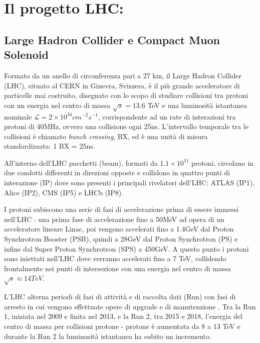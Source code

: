 \chapter{Il progetto LHC:}


\section{Large Hadron Collider e Compact Muon Solenoid}
Formato da un anello di circonferenza pari a 27 km, il Large Hadron Collider (LHC), situato al CERN in Ginevra, Svizzera, è il più grande acceleratore di particelle mai costruito, disegnato con lo scopo di studiare collisioni tra protoni con un energia nel centro di massa $\sqrt{s} = 13.6$ TeV e una luminosità istantanea nominale $\mathcal{L} = 2 \times 10^{34} cm^{-2} s^{-1}$, corrispondente ad un rate di interazioni tra protoni di 40MHz, ovvero una collisione ogni 25ns. L'intervallo temporale tra le collisioni è chiamato \textit{bunch crossing}, BX, ed è una unità di misura standardizzata: 1 BX = 25ns.


All'interno dell'LHC pacchetti (beam), formati da $1.1 \times 10^{11}$ protoni, circolano in due condotti differenti in direzioni opposte e collidono in quattro punti di interazione (IP) dove sono presenti i principali rivelatori dell'LHC: ATLAS (IP1), Alice (IP2), CMS (IP5) e LHCb (IP8).

I protoni subiscono una serie di fasi di accelerazione prima di essere immessi nell'LHC \cite{evans2008lhc}: una prima fase di accelerazione fino a 50MeV ad opera di un acceleratore lineare Linac, poi vengono accelerati fino a 1.4GeV dal Proton Synchrotron Booster (PSB), quindi a 28GeV dal Proton Synchrotron (PS) e infine dal Super Proton Synchrotron (SPS) a 450GeV. A questo punto i protoni sono iniettati nell'LHC dove verranno accelerati fino a 7 TeV, collidendo frontalmente nei punti di intersezione con una energia nel centro di massa $\sqrt{s} \approx 14TeV$.

L'LHC alterna periodi di fasi di attività e di raccolta dati (Run) con fasi di arresto in cui vengono effettuate opere di upgrade e di manutenzione \cite{sirunyan2020performance}. Tra la Run 1, iniziata nel 2009 e finita nel 2013, e la Run 2, tra 2015 e 2018, l'energia del centro di massa per collisioni protone - protone è aumentata da 8 a 13 TeV e durante la Run 2 la luminosità istantanea ha subito un incremento.




